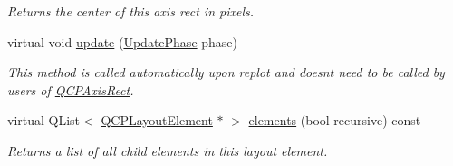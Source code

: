 \begin{DoxyCompactItemize}
\begin{DoxyCompactList}\small\item\em Returns the center of this axis rect in pixels. \end{DoxyCompactList}\item 
virtual void \hyperlink{classQCPAxisRect_a255080a017df9083a60a321ef2ba9ed8}{update} (\hyperlink{classQCPLayoutElement_a0d83360e05735735aaf6d7983c56374d}{Update\+Phase} phase)
\begin{DoxyCompactList}\small\item\em This method is called automatically upon replot and doesn\textquotesingle{}t need to be called by users of \hyperlink{classQCPAxisRect}{Q\+C\+P\+Axis\+Rect}. \end{DoxyCompactList}\item 
virtual Q\+List$<$ \hyperlink{classQCPLayoutElement}{Q\+C\+P\+Layout\+Element} $\ast$ $>$ \hyperlink{classQCPAxisRect_a2bda6bf2b5b5797f92583cecd01c8949}{elements} (bool recursive) const 
\begin{DoxyCompactList}\small\item\em Returns a list of all child elements in this layout element. \end{DoxyCompactList}\end{DoxyCompactItemize}
